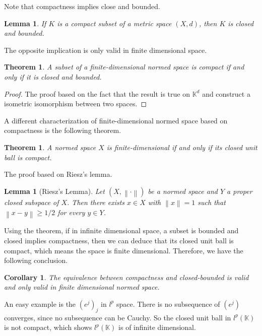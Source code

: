 \documentclass[12pt,a4paper]{article}
\numberwithin{equation}{section}
\theoremstyle{mystyle}
\newtheorem{theorem}[definition]{Theorem}
\newtheorem{lemma}[definition]{Lemma}
\newtheorem{corollary}[definition]{Corollary}
\newcommand{\K}{\mathbb{K}}
\newcommand{\norm}[1]{\left\lVert #1 \right\rVert}
\begin{document}
	Note that compactness implies close and bounded. 
	\begin{lemma}
		If $K$ is a compact subset of a metric space $(X,d)$, then $K$ is closed and bounded.
	\end{lemma}
	The opposite implication is only valid in finite dimensional space.
	\begin{theorem}
		A subset of a finite-dimensional normed space is compact if and only if it is closed and bounded.
	\end{theorem}
	\begin{proof}
		The proof based on the fact that the result is true on $\K^d$ and construct a isometric isomorphism between two spaces.
	\end{proof}
	A different characterization of finite-dimensional normed space based on compactness is the following theorem.
	\begin{theorem}
		A normed space $X$ is finite-dimensional if and only if its closed unit ball is compact.
	\end{theorem}
	The proof based on Riesz's lemma.
	\begin{lemma}[Riesz's Lemma]
		Let $(X,\norm{\cdot})$ be a normed space and $Y$ a proper closed subspace of $X$. Then there exists $x\in X$ with $\norm{x}=1$ such that $\norm{x-y}\geq 1/2$ for every $y\in Y$.
	\end{lemma}

	Using the theorem, if in infinite dimensional space, a subset is bounded and closed implies compactness, then we can deduce that its closed unit ball is compact, which means the space is finite dimensional. Therefore, we have the following conclusion.
	\begin{corollary}
		The equivalence between compactness and closed-bounded is valid and only valid in finite dimensional normed space.
	\end{corollary}
	
	An easy example is the $(e^j)_j$ in $l^p$ space. There is no subsequence of $(e^j)$ converges, since no subsequence can be Cauchy. So the closed unit ball in $l^p(\K)$ is not compact, which shows $l^p(\K)$ is of infinite dimensional.
	
	\appendix
	
	 
\end{document}
